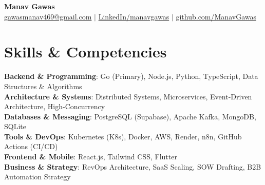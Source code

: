 \documentclass[11pt,letterpaper]{article}
\begin{document}
\begin{center}
    {\Huge \textbf{\color{DeepBlue}Manav Gawas}} \\ \vspace{6pt}
    \small \href{mailto:gawasmanav469@gmail.com}{\color{DeepBlue}gawasmanav469@gmail.com} $|$ \href{https://www.linkedin.com/in/manavgawas/}{\color{DeepBlue}LinkedIn/manavgawas} $|$ \href{https://github.com/ManavGawas}{\color{DeepBlue}github.com/ManavGawas}
\end{center}
\vspace{2pt}

\section{Skills \& Competencies}
 \begin{itemize}[leftmargin=0.15in, label={}, itemsep=1pt, parsep=0pt]
    \small{\item{
     \textbf{Backend \& Programming}{: Go (Primary), Node.js, Python, TypeScript, Data Structures \& Algorithms} \\
     \textbf{Architecture \& Systems}{: Distributed Systems, Microservices, Event-Driven Architecture, High-Concurrency} \\
     \textbf{Databases \& Messaging}{: PostgreSQL (Supabase), Apache Kafka, MongoDB, SQLite} \\
     \textbf{Tools \& DevOps}{: Kubernetes (K8s), Docker, AWS, Render, n8n, GitHub Actions (CI/CD)} \\
     \textbf{Frontend \& Mobile}{: React.js, Tailwind CSS, Flutter} \\
     \textbf{Business \& Strategy}{: RevOps Architecture, SaaS Scaling, SOW Drafting, B2B Automation Strategy}
    }}
 \end{itemize}

\end{document}
